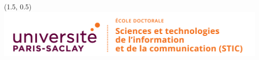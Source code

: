 
\pagestyle{empty}


\setlength{\fboxsep}{5mm}
\areaset%
{\textwidth}%
{\dimexpr\the{}\relax}%

\begin{textblock}{1} (1.5, 0.5)
    \includegraphics[scale=.75]{../gfx/STIC.png} %
\end{textblock}

\vspace*{\fill}


